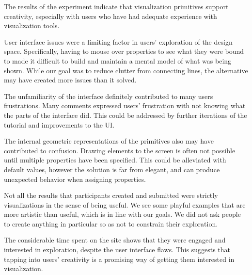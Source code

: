 \label{discussion}

The results of the experiment indicate that visualization primitives support creativity, especially with users who have had adequate experience with visualization tools.

User interface issues were a limiting factor in users' exploration of the design space.
Specifically, having to mouse over properties to see what they were bound to made it difficult to build and maintain a mental model of what was being shown.
While our goal was to reduce clutter from connecting lines, the alternative may have created more issues than it solved.

The unfamiliarity of the interface definitely contributed to many users frustrations.
Many comments expressed users' frustration with not knowing what the parts of the interface did.
This could be addressed by further iterations of the tutorial and improvements to the UI.

The internal geometric representations of the primitives also may have contributed to confusion.
Drawing elements to the screen is often not possible until multiple properties have been specified.
This could be alleviated with default values, however the solution is far from elegant, and can produce unexpected behavior when assigning properties.

Not all the results that participants created and submitted were strictly visualizations in the sense of being useful. We see some playful examples that are more artistic than useful, which is in line with our goals. We did not ask people to create anything in particular so as not to constrain their exploration.

The considerable time spent on the site shows that they were engaged and interested in exploration, despite the user interface flaws.
This suggests that tapping into users' creativity is a promising way of getting them interested in visualization.